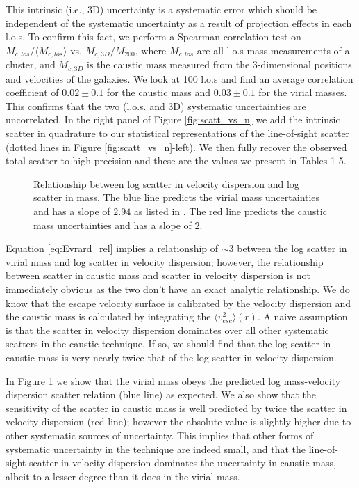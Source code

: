 \documentclass[iop]{emulateapj}
\begin{document}
This intrinsic (i.e., 3D) uncertainty is a systematic error which should be independent of the systematic uncertainty as a result of projection effects in each l.o.s. To confirm this fact, we perform a Spearman correlation test on $M_{c,los} / \langle M_{c,los} \rangle$ vs. $M_{c,3D}/M_{200}$, where $M_{c,los}$ are all l.o.s mass measurements of a cluster, and $M_{c,3D}$ is the caustic mass measured from the 3-dimensional positions and velocities of the galaxies. We look at 100 l.o.s and find an average correlation coefficient of $0.02 \pm 0.1$ for the caustic mass and $0.03 \pm 0.1$ for the virial masses. This confirms that the two (l.o.s. and 3D) systematic uncertainties are uncorrelated. In the right panel of Figure \ref{fig:scatt_vs_n} we add the intrinsic scatter in quadrature to our statistical representations of the line-of-sight scatter (dotted lines in Figure \ref{fig:scatt_vs_n}-left). We then fully recover the observed total scatter to high precision and these are the values we present in Tables 1-5.

\begin{figure}
\caption{Relationship between log scatter in velocity dispersion and log scatter in mass. The blue line predicts the virial mass uncertainties and has a slope of $2.94$ as listed in \citet{Evrard08}. The red line predicts the caustic mass uncertainties and has a slope of $2$.}
\label{fig:vdisp_vs_mass_scatt}
\end{figure}

Equation \ref{eq:Evrard_rel} implies a relationship of $\sim 3$ between the log scatter in virial mass and log scatter in velocity dispersion; however, the relationship between scatter in caustic mass and scatter in velocity dispersion is not immediately obvious as the two don't have an exact analytic relationship. We do know that the escape velocity surface is calibrated by the velocity dispersion and the caustic mass is calculated by integrating the $\langle v_{esc}^2\rangle (r)$. A naive assumption is that the scatter in velocity dispersion dominates over all other systematic scatters in the caustic technique. If so, we should find that the log scatter in caustic mass is very nearly twice that of the log scatter in velocity dispersion.

In Figure \ref{fig:vdisp_vs_mass_scatt} we show that the virial mass obeys the predicted log mass-velocity dispersion scatter relation (blue line) as expected. We also show that the sensitivity of the scatter in caustic mass is well predicted by twice the scatter in velocity dispersion (red line); however the absolute value is slightly higher due to other systematic sources of uncertainty. This implies that other forms of systematic uncertainty in the technique are indeed small, and that the line-of-sight scatter in velocity dispersion dominates the uncertainty in caustic mass, albeit to a lesser degree than it does in the virial mass.
\end{document}

